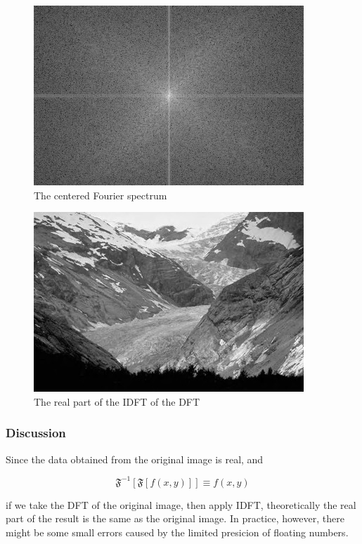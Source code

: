\documentclass{article}
\begin{document}
\begin{figure}[H]
	\centering
	\includegraphics[width=288pt]{../result/dft-spectrum.png}
	\caption{The centered Fourier spectrum}
\end{figure}

\begin{figure}[H]
	\centering
	\includegraphics[width=288pt]{../result/dft-double.png}
	\caption{The real part of the IDFT of the DFT}
\end{figure}


\subsubsection{Discussion}

\indent Since the data obtained from the original image is real, and

$$\mathfrak{F}^{-1}[\mathfrak{F}[f(x,y)]] \equiv f(x,y)$$

if we take the DFT of the original image, then apply IDFT, theoretically the real part of the result is the same as the original image. In practice, however, there might be some small errors caused by the limited presicion of floating numbers.
\end{document}
